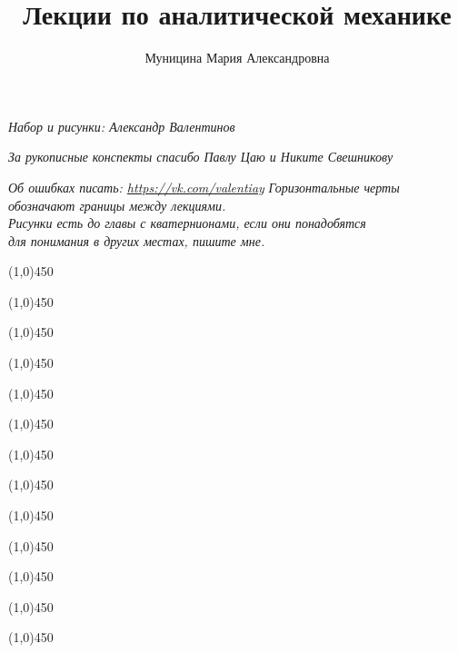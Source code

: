 \documentclass{article}
\author{Муницина Мария Александровна}
\title{Лекции по аналитической механике}
\newcommand{\lline}{\begin{center}\line(1,0){450}\end{center}}
\begin{document}
  \label{title}
  \vfill
  \begin{titlepage}
  \maketitle
  \begin{center}
  {\itshape\small Набор и рисунки: Александр Валентинов}

  {\itshape\small За рукописные конспекты спасибо Павлу Цаю и Никите Свешникову}

  {\itshape\small Об ошибках писать: \url{https://vk.com/valentiay}}
  \vfill
  {\itshape\small Горизонтальные черты обозначают границы между лекциями. \\ Рисунки есть до главы с кватернионами, если они понадобятся \\ для понимания в других местах, пишите мне.}
  \vfill

  \end{center}
  \thispagestyle{empty}
  \end{titlepage}

  \pagestyle{fancy}
  \renewcommand{\footrulewidth}{0.2mm}
  \fancyhead{}
  \fancyfoot[C]{\thepage}
  
  \pagebreak
  \tableofcontents
  \pagebreak
  
    \lline
    \lline
    \lline
    \lline
    \lline
    \lline
    \lline
    \lline
    \lline
    \lline
    \lline
    \lline
    \lline
  
\end{document}
